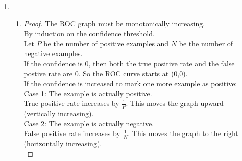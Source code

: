 \documentclass[12pt]{article}
\begin{document}
\begin{enumerate}
\begin{proof}
      From this, we have that $Precision(B)\leq Precision(A)$, which
      contradicts with the original assumption that $Precision(B)>Precision(A)$
      , so the Precision-Recall curve of A must dominate the Precision-Recall
      curve of B.\\
    \end{proof}
  \item
    \begin{enumerate}
      \item
        \begin{proof} The ROC graph must be monotonically increasing.\\
        By induction on the confidence threshold.\\
        Let $P$ be the number of positive examples and $N$ be the number of
        negative examples.\\
        If the confidence is 0, then both the true positive rate and the
        false postive rate are 0. So the ROC curve starts at (0,0).\\

        If the confidence is increased to mark one more example as positive:\\

        Case 1: The example is actually positive.\\
        True positive rate increases by $\frac{1}{P}$. This moves the graph
        upward (vertically increasing).\\

        Case 2: The example is actually negative.\\
        False positive rate increases by $\frac{1}{N}$. This moves the graph to
        the right (horizontally increasing).\\


\end{proof}
\end{enumerate}
\end{enumerate}
\end{document}
